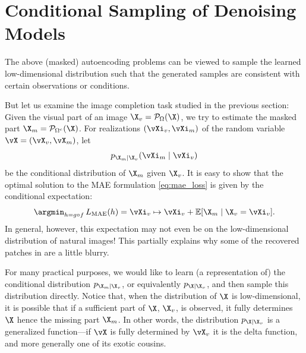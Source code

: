 \documentclass[../../book-main.tex]{subfiles}
\begin{document}


\section{Conditional  Sampling of Denoising Models}
\label{sec:conditioned-decoding}
The above (masked) autoencoding problems can be viewed to sample the learned low-dimensional distribution such that the generated samples are consistent with certain observations or conditions.

But let us examine the image completion task studied in the previous
section: Given the
visual part of an image $\X_v = \mathcal{P}_{\Omega}(\X)$, we try to
estimate the masked part $\X_m = \mathcal{P}_{\Omega^c}(\X)$. For realizations
$(\vXi_v, \vXi_m)$ of the random variable $\vX=(\vX_v, \vX_m)$, let
\[p_{\X_m \mid \X_v}(\vXi_m\mid \vXi_v)\]
be the conditional distribution of $\X_m$ given
$\X_v$. It is easy to show that the optimal solution to the  MAE
formulation \eqref{eq:mae_loss} is given by the conditional expectation:
\begin{equation}
  \argmin_{h = g \circ f}\, L_{\mathrm{MAE}}(h)
  = \vXi_v \mapsto \vXi_v + \mathbb{E}[\X_m \mid \X_v=\vXi_v].
\end{equation}
In general, however, this expectation may not even be on the
low-dimensional distribution of natural images! This partially
explains why some of the recovered patches in 
are a little blurry.

For many practical purposes, we would like to learn (a representation
of) the conditional distribution $p_{\X_m \mid \X_v}$, or equivalently
$p_{\X \mid \X_v}$,
and then sample this distribution directly. Notice that, when the
distribution of $\X$ is low-dimensional, it is possible that if a
sufficient part of $\X$, $\X_v$, is observed, it fully determines
$\X$ hence the missing part $\X_m$. In other words, the distribution
$p_{\X \mid \X_v}$ is a generalized function---if $\vX$ is fully determined by
$\vX_v$ it is the delta function, and more generally one of its exotic cousins.
\end{document}
